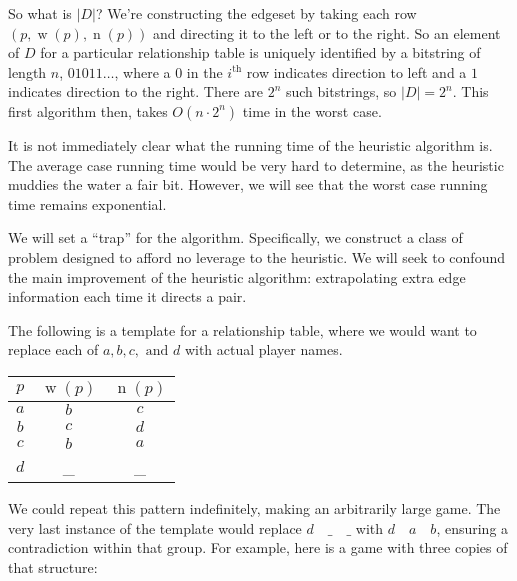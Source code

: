 \documentclass[12pt,x11names, rgb]{article}
\DeclareMathOperator{\w}{w}
\DeclareMathOperator{\n}{n}
\begin{document}
    So what is $\lvert D \rvert$? We're constructing the edgeset by taking each row $(p, \w(p), \n(p))$ and directing it to the left or to the right. So an element of $D$ for a particular relationship table is uniquely identified by a bitstring of length $n$, $01011\ldots$, where a $0$ in the $i^{\text{th}}$ row indicates direction to left and a $1$ indicates direction to the right. There are $2^n$ such bitstrings, so $\lvert D \rvert = 2^n$. This first algorithm then, takes $O(n \cdot 2^n)$ time in the worst case. 

    It is not immediately clear what the running time of the heuristic algorithm is. The average case running time would be very hard to determine, as the heuristic muddies the water a fair bit. However, we will see that the worst case running time remains exponential.

    We will set a ``trap'' for the algorithm. Specifically, we construct a class of problem designed to afford no leverage to the heuristic. We will seek to confound the main improvement of the heuristic algorithm: extrapolating extra edge information each time it directs a pair. 

    The following is a template for a relationship table, where we would want to replace each of $a, b, c, \text{ and }d$ with actual player names.

    \begin{center}
        \begin{tabular}{c | c | c}
            $p$ & $\w(p)$ & $\n(p)$\\
            \hline
            $a$ & $b$ & $c$\\
            $b$ & $c$ & $d$\\
            $c$ & $b$ & $a$\\
            $d$ & \_ & \_
        \end{tabular}
    \end{center}

    We could repeat this pattern indefinitely, making an arbitrarily large game. The very last instance of the template would replace $d \quad \_ \quad \_$ with $d \quad a \quad b$, ensuring a contradiction within that group. For example, here is a game with three copies of that structure:
\end{document}
